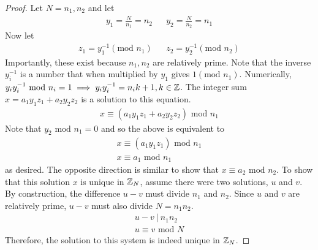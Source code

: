 \documentclass[12pt]{scrartcl}
\begin{document}
\begin{proof}
  Let $N = n_1, n_2$ and let
  \begin{align*}
    y_1 = \frac{N}{n_1} = n_2 && y_2 = \frac{N}{n_2} = n_1
  \end{align*}
  Now let
  \begin{align*}
    z_1 = y_1^{-1} (\text{mod } n_1) && z_2 = y_2^{-1} (\text{mod } n_2)
  \end{align*}
  Importantly, these exist because $n_1, n_2$ are relatively prime. Note that the inverse $y_i^{-1}$ is a number that when multiplied by $y_1$ gives $1 (\text{mod } n_1)$. 
  Numerically, $y_i y_i^{-1} \text{ mod } n_i = 1 \implies y_iy_i^{-1} = n_ik + 1, k \in \mathbb Z$.
  The integer sum $x = a_1y_1z_1 + a_2y_2z_2$ is a solution to this equation. 
  \begin{align*}
    x \equiv (a_1y_1z_1 + a_2y_2z_2) \text{ mod } n_1
  \end{align*}
  Note that $y_2 \text{ mod } n_1 = 0$ and so the above is equivalent to
  \begin{align*}
    x \equiv (a_1 y_1 z_1) \text{ mod } n_1\\
    x \equiv a_1 \text{ mod } n_1
  \end{align*}
  as desired. The opposite direction is similar to show that $x \equiv a_2 \text{ mod } n_2$. To show that this solution 
  $x$ is unique in $\mathbb Z_N$, assume there 
  were two solutions, $u$ and $v$. By construction, the difference $u - v$ must divide $n_1$ and $n_2$. 
  Since $u$ and $v$ are relatively prime, $u - v$ must also divide $N = n_1n_2$.
  \begin{align*}
    u - v \ | \ n_1n_2\\
    u \equiv v \text{ mod } N
  \end{align*}
  Therefore, the solution to this system is indeed unique in $\mathbb Z_N$. 
  
\end{proof}
\end{document}
